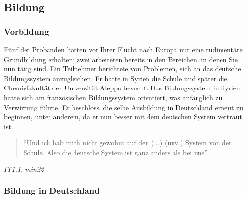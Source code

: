 \subsection{Bildung}


\subsubsection{Vorbildung}
Fünf der Probanden hatten vor Ihrer Flucht nach Europa nur eine rudimentäre Grundbildung erhalten; zwei arbeiteten bereits in den Bereichen, in denen Sie nun tätig sind.\newline
Ein Teilnehmer berichtete von Problemen, sich an das deutsche Bildungssystem anzugleichen. Er hatte in Syrien die Schule und später die Chemiefakultät der Universität Aleppo besucht. Das Bildungssystem in Syrien hatte sich am französischen Bildungssystem orientiert, was anfänglich zu Verwirrung führte.\newline
Er beschloss, die selbe Ausbildung in Deutschland erneut zu beginnen, unter anderem, da er nun besser mit dem deutschen System vertraut ist.

\begin{quote}
    ``Und ich hab mich nicht gewöhnt auf den (...) (unv.) System von der Schule. Also die deutsche System ist ganz anders als bei uns''
\end{quote}
\centerline{\textit{IT1.1, min22}}


\subsubsection{Bildung in Deutschland}

